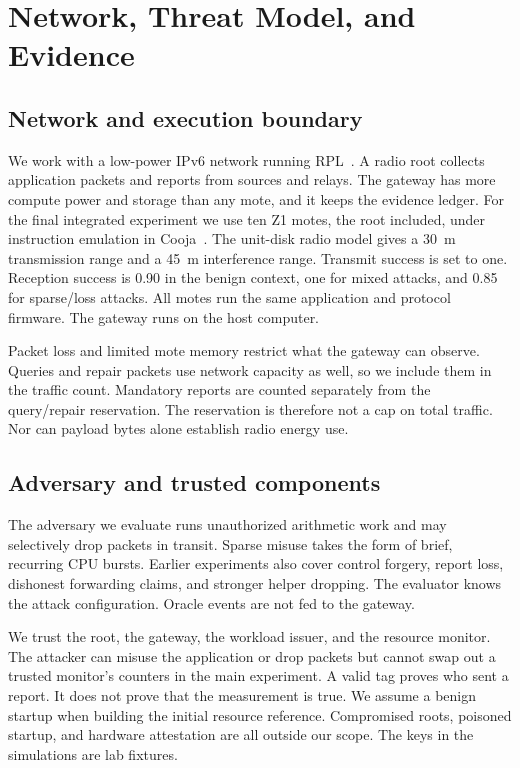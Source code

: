 \documentclass[journal]{IEEEtran}
\begin{document}
\section{Network, Threat Model, and Evidence}
\subsection{Network and execution boundary}
We work with a low-power IPv6 network running RPL~\cite{rpl}. A radio root collects application packets and reports from sources and relays. The gateway has more compute power and storage than any mote, and it keeps the evidence ledger. For the final integrated experiment we use ten Z1 motes, the root included, under instruction emulation in Cooja~\cite{cooja}. The unit-disk radio model gives a 30~m transmission range and a 45~m interference range. Transmit success is set to one. Reception success is 0.90 in the benign context, one for mixed attacks, and 0.85 for sparse/loss attacks. All motes run the same application and protocol firmware. The gateway runs on the host computer.

Packet loss and limited mote memory restrict what the gateway can observe. Queries and repair packets use network capacity as well, so we include them in the traffic count. Mandatory reports are counted separately from the query/repair reservation. The reservation is therefore not a cap on total traffic. Nor can payload bytes alone establish radio energy use.

\subsection{Adversary and trusted components}
The adversary we evaluate runs unauthorized arithmetic work and may selectively drop packets in transit. Sparse misuse takes the form of brief, recurring CPU bursts. Earlier experiments also cover control forgery, report loss, dishonest forwarding claims, and stronger helper dropping. The evaluator knows the attack configuration. Oracle events are not fed to the gateway.

We trust the root, the gateway, the workload issuer, and the resource monitor. The attacker can misuse the application or drop packets but cannot swap out a trusted monitor's counters in the main experiment. A valid tag proves who sent a report. It does not prove that the measurement is true. We assume a benign startup when building the initial resource reference. Compromised roots, poisoned startup, and hardware attestation are all outside our scope. The keys in the simulations are lab fixtures.
\end{document}
